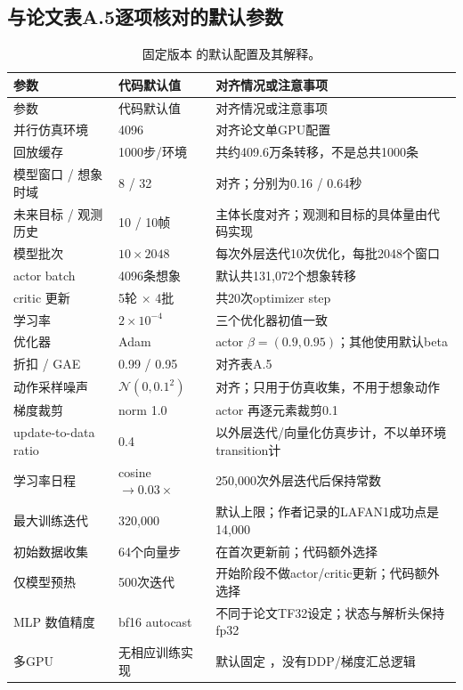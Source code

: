 \subsection{与论文表A.5逐项核对的默认参数}
\begin{longtable}{@{}P{45mm}P{31mm}P{78mm}@{}}
\caption{固定版本  的默认配置及其解释。}\label{tab:hyper}\\
\toprule 参数 & 代码默认值 & 对齐情况或注意事项\\\midrule\endfirsthead
\toprule 参数 & 代码默认值 & 对齐情况或注意事项\\\midrule\endhead
并行仿真环境 & 4096 & 对齐论文单GPU配置\\
回放缓存 & 1000步/环境 & 共约409.6万条转移，不是总共1000条\\
模型窗口 / 想象时域 & 8 / 32 & 对齐；分别为0.16 / 0.64秒\\
未来目标 / 观测历史 & 10 / 10帧 & 主体长度对齐；观测和目标的具体量由代码实现\\
模型批次 & $10\times2048$ & 每次外层迭代10次优化，每批2048个窗口\\
actor batch & 4096条想象 & 默认共131,072个想象转移\\
critic 更新 & 5轮 $\times$ 4批 & 共20次optimizer step\\
学习率 & $2\times10^{-4}$ & 三个优化器初值一致\\
优化器 & Adam & actor $\beta=(0.9,0.95)$；其他使用默认beta\\
折扣 / GAE & 0.99 / 0.95 & 对齐表A.5\\
动作采样噪声 & $\mathcal N(0,0.1^2)$ & 对齐；只用于仿真收集，不用于想象动作\\
梯度裁剪 & norm 1.0 & actor 再逐元素裁剪0.1\\
update-to-data ratio & 0.4 & 以外层迭代/向量化仿真步计，不以单环境transition计\\
学习率日程 & cosine $\to0.03\times$ & 250,000次外层迭代后保持常数\\
最大训练迭代 & 320,000 & 默认上限；作者记录的LAFAN1成功点是14,000\\
初始数据收集 & 64个向量步 & 在首次更新前；代码额外选择\\
仅模型预热 & 500次迭代 & 开始阶段不做actor/critic更新；代码额外选择\\
MLP 数值精度 & bf16 autocast & 不同于论文TF32设定；状态与解析头保持fp32\\
多GPU & 无相应训练实现 & 默认固定 ，没有DDP/梯度汇总逻辑\\
\bottomrule
\end{longtable}

